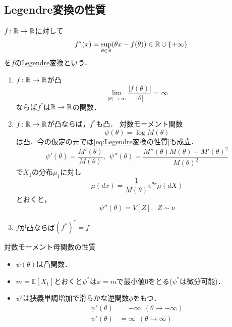 \subsection{Legendre変換の性質}
    $f\colon \mathbb{R}\to \mathbb{R}$に対して
\begin{equation}
    f^*(x)= \sup_{\theta\in \mathbb{R}} (\theta x- f(\theta))\in \mathbb{R}\cup \{+\infty\}
\end{equation}
    を$f$の\underline{Legendre変換}という．
\begin{enumerate}
    \item $f\colon \mathbb{R}\to \mathbb{R}$が凸
\begin{equation} \label{eq:Legendre変換の性質}
    \lim_{|\theta|\to \infty} \frac{|f(\theta)|}{|\theta|}= \infty
\end{equation}
    ならば$f^*$は$\mathbb{R}\to \mathbb{R}$の関数．
    \item $f\colon \mathbb{R}\to \mathbb{R}$が凸ならば，$f^*$も凸．
    対数モーメント関数
\begin{equation}
    \psi(\theta)= \log{M(\theta)}
\end{equation}
    は凸．今の仮定の元では\eqref{eq:Legendre変換の性質}も成立．
\begin{equation}
    \psi'(\theta)= \frac{M'(\theta)}{M(\theta)},\ \ \psi''(\theta)= \frac{M''(\theta)M(\theta)- M'(\theta)^2}{M(\theta)^2}
\end{equation}
    で$X_1$の分布$\mu_1$に対し  
\begin{equation}
    \mu(dx)= \frac{1}{M(\theta)}e^{\theta x}\mu(dX)
\end{equation}
    とおくと，
\begin{equation}
    \psi''(\theta)= V[Z],\ \ Z\sim \nu
\end{equation}
    \item $f$が凸ならば$(f^*)^*= f$
\end{enumerate}
    対数モーメント母関数の性質
\begin{itemize}
    \item $\psi(\theta)$は凸関数．
    \item $m= \mathbb{E}[X_1]$とおくと$\psi^*$は$x= m$で最小値0をとる($\psi^*$は微分可能)．
    \item $\psi'$は狭義単調増加で滑らかな逆関数$\phi$をもつ．
\begin{align}
    \psi'(\theta)&= -\infty\ \ (\theta\to -\infty)\\
    \psi'(\theta)&= \infty\ \ (\theta\to \infty)
\end{align}
\end{itemize}


